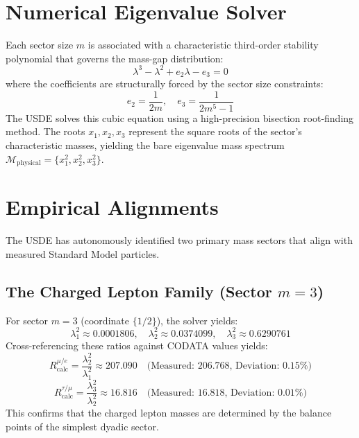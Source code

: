 \documentclass[11pt,a4paper]{article}
\begin{document}
\section{Numerical Eigenvalue Solver}
Each sector size $m$ is associated with a characteristic third-order stability polynomial that governs the mass-gap distribution:
\begin{equation}
\lambda^3 - \lambda^2 + e_2 \lambda - e_3 = 0
\end{equation}
where the coefficients are structurally forced by the sector size constraints:
\begin{equation}
e_2 = \frac{1}{2m}, \quad e_3 = \frac{1}{2m^5 - 1}
\end{equation}
The USDE solves this cubic equation using a high-precision bisection root-finding method. The roots $x_1, x_2, x_3$ represent the square roots of the sector's characteristic masses, yielding the bare eigenvalue mass spectrum $\mathcal{M}_{\text{physical}} = \{x_1^2, x_2^2, x_3^2\}$.

\section{Empirical Alignments}
The USDE has autonomously identified two primary mass sectors that align with measured Standard Model particles.

\subsection{The Charged Lepton Family (Sector $m=3$)}
For sector $m=3$ (coordinate $\{1/2\}$), the solver yields:
\begin{equation}
\lambda_1^2 \approx 0.0001806, \quad \lambda_2^2 \approx 0.0374099, \quad \lambda_3^2 \approx 0.6290761
\end{equation}
Cross-referencing these ratios against CODATA values yields:
\begin{equation}
R_{\text{calc}}^{\mu/e} = \frac{\lambda_2^2}{\lambda_1^2} \approx 207.090 \quad \text{(Measured: 206.768, Deviation: 0.15\%)}
\end{equation}
\begin{equation}
R_{\text{calc}}^{\tau/\mu} = \frac{\lambda_3^2}{\lambda_2^2} \approx 16.816 \quad \text{(Measured: 16.818, Deviation: 0.01\%)}
\end{equation}
This confirms that the charged lepton masses are determined by the balance points of the simplest dyadic sector.
\end{document}
